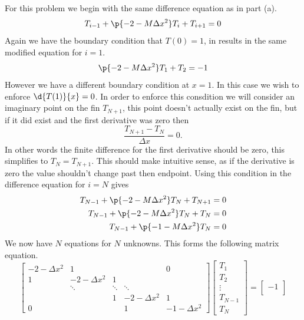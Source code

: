 \documentclass[11pt, oneside]{article}
\begin{document}
\begin{enumerate}
\begin{enumerate}
        For this problem we begin with the same difference equation as in part (a).
        \[
          T_{i - 1} + \p{- 2 - M\Delta x^2}T_i + T_{i+1} = 0
        \]
        Again we have the boundary condition that $T(0) = 1$, in results in
        the same modified equation for $i = 1$.
        \[
           \p{- 2 - M\Delta x^2}T_1 + T_2 = -1
        \]
        However we have a different boundary condition at $x = 1$.
        In this case we wish to enforce $\d{T(1)}{x} = 0$.
        In order to enforce this consdition we will consider an
        imaginary point on the fin $T_{N + 1}$, this point doesn't actually
        exist on the fin, but if it did exist and the first derivative was
        zero then
        \[
          \frac{T_{N + 1} - T_N}{\Delta x} = 0.
        \]
        In other words the finite difference for the first derivative
        should be zero, this simplifies to $T_N = T_{N + 1}$.
        This should make intuitive sense, as if the derivative is zero the value
        shouldn't change past then endpoint.
        Using this condition in the difference equation for $i = N$ gives
        \begin{align*}
          T_{N - 1} + \p{- 2 - M\Delta x^2}T_N + T_{N+1} &= 0 \\
          T_{N - 1} + \p{- 2 - M\Delta x^2}T_N + T_{N} &= 0 \\
          T_{N - 1} + \p{-1 - M\Delta x^2}T_N &= 0
        \end{align*}
        We now have $N$ equations for $N$ unknowns.
        This forms the following matrix equation.
        \[
          \begin{bmatrix}
            -2 - \Delta x^2 & 1 & & & 0 \\
            1 & -2 - \Delta x^2 & 1 &  \\
             & \ddots & \ddots & \ddots &  \\
             &  & 1 & -2 - \Delta x^2  & 1  \\
            0 &  &  & 1 & -1 - \Delta x^2
          \end{bmatrix}
          \begin{bmatrix}
            T_1 \\
            T_2 \\
            \vdots \\
            T_{N - 1} \\
            T_{N}
          \end{bmatrix}
          =
          \begin{bmatrix}
            -1 \\

\end{bmatrix}\]
\end{enumerate}
\end{enumerate}
\end{document}
